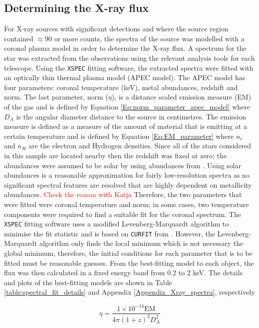 \subsection{Determining the X-ray flux}
\label{Section_Determining_Xray_flux}
For X-ray sources with significant detections and where the source region contained $\approx 90$ or more counts, the spectra of the source was modelled with a coronal plasma model in order to determine the X-ray flux. A spectrum for the star was extracted from the observations using the relevant analysis tools for each telescope. Using the \texttt{XSPEC} fitting software, the extracted spectra were fitted with an optically thin thermal plasma model (APEC model). The APEC model has four parameters: coronal temperature (keV), metal abundances, redshift and norm. The last parameter, norm ($\eta$), is a distance scaled emission measure (EM) of the gas and is defined by Equation \ref{Eq:norm_parameter_apec_model} where $D_{A}$ is the angular diameter distance to the source in centimetres. The emission measure is defined as a measure of the amount of material that is emitting at a certain temperature and is defined by Equation \ref{Eq:EM_parameter} where $n_{e}$ and $n_{H}$ are the electron and Hydrogen densities. Since all of the stars considered in this sample are located nearby then the redshift was fixed at zero; the abundances were assumed to be solar by using abundances from \citet{Grevesse_Sauval_1998}. Using solar abundances is a reasonable approximation for fairly low-resolution spectra as no significant spectral features are resolved that are highly dependent on metallicity abundances. \textcolor{red}{Check the reason with Katja}
Therefore, the two parameters that were fitted were coronal temperature and norm; in some cases, two temperature components were required to find a suitable fit for the coronal spectrum. The \texttt{XSPEC} fitting software uses a modified Levenberg-Marquardt algorithm to minimise the fit statistic and is based on \texttt{CURFIT} from \citet{Bevington_1969}. However, the Levenberg-Marquardt algorithm only finds the local minimum which is not necessary the global minimum, therefore, the initial conditions for each parameter that is to be fitted must be reasonable guesses. From the best-fitting model to each object, the flux was then calculated in a fixed energy band from 0.2 to 2 keV. The details and plots of the best-fitting models are shown in Table \ref{table:spectral_fit_details} and Appendix \ref{Appendix_Xray_spectra}, respectively

\begin{equation}
    \eta = \frac{1 \times 10^{-14} \text{EM}}{4\pi(1+z)^{2}D_{A}^{2}}
    \label{Eq:norm_parameter_apec_model}
\end{equation}

